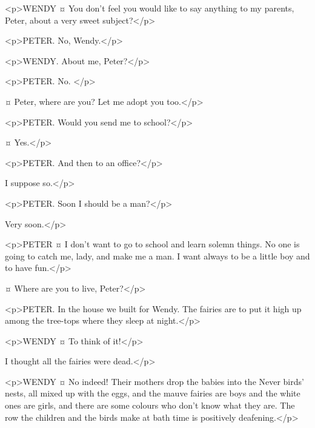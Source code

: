 \begin{drama}

<p>WENDY ¤
You don't feel you would like to say anything to my parents, Peter, about a very sweet subject?</p>

<p>PETER. No, Wendy.</p>

<p>WENDY. About me, Peter?</p>

<p>PETER. No.
</p>

\mrsdarlingspeaks {}¤
Peter, where are you? Let me adopt you too.</p>


<p>PETER. Would you send me to school?</p>

\mrsdarlingspeaks {}¤
Yes.</p>

<p>PETER. And then to an office?</p>

\mrsdarlingspeaks
I suppose so.</p>

<p>PETER. Soon I should be a man?</p>

\mrsdarlingspeaks
Very soon.</p>

<p>PETER ¤
I don't want to go to school and learn solemn things. No one is going to catch me, lady, and make me a man. I want always to be a little boy and to have fun.</p>


\mrsdarlingspeaks {}¤
Where are you to live, Peter?</p>

<p>PETER. In the house we built for Wendy. The fairies are to put it high up among the tree-tops where they sleep at night.</p>

<p>WENDY ¤
To think of it!</p>

\mrsdarlingspeaks
I thought all the fairies were dead.</p>

<p>WENDY ¤
No indeed! Their mothers drop the babies into the Never birds' nests, all mixed up with the eggs, and the mauve fairies are boys and the white ones are girls, and there are some colours who don't know what they are. The row the children and the birds make at bath time is positively deafening.</p>


\end{drama}
